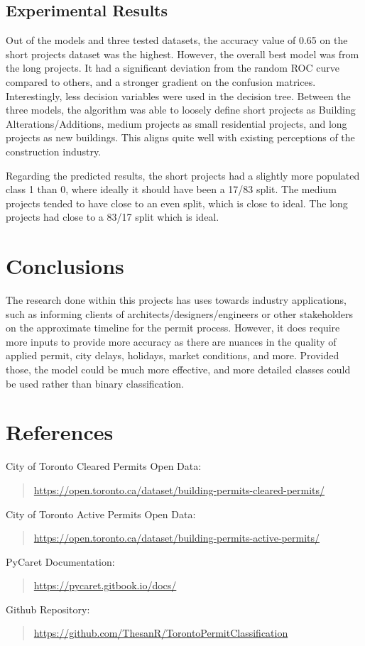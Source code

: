 \documentclass{article}
\begin{document}
\subsection{Experimental Results}
Out of the models and three tested datasets, the accuracy value of 0.65 on the short projects dataset was the highest. However, the overall best model was from the long projects. It had a significant deviation from the random ROC curve compared to others, and a stronger gradient on the confusion matrices. Interestingly, less decision variables were used in the decision tree. Between the three models, the algorithm was able to loosely define short projects as Building Alterations/Additions, medium projects as small residential projects, and long projects as new buildings. This aligns quite well with existing perceptions of the construction industry. 

Regarding the predicted results, the short projects had a slightly more populated class 1 than 0, where ideally it should have been a 17/83 split. The medium projects tended to have close to an even split, which is close to ideal. The long projects had close to a 83/17 split which is ideal. 

\section{Conclusions}
The research done within this projects has uses towards industry applications, such as informing clients of architects/designers/engineers or other stakeholders on the approximate timeline for the permit process. However, it does require more inputs to provide more accuracy as there are nuances in the quality of applied permit, city delays, holidays, market conditions, and more. Provided those, the model could be much more effective, and more detailed classes could be used rather than binary classification.

\section{References}
City of Toronto Cleared Permits Open Data:
\begin{quote}
    \url{https://open.toronto.ca/dataset/building-permits-cleared-permits/}
\end{quote}


City of Toronto Active Permits Open Data:
\begin{quote}
    \url{https://open.toronto.ca/dataset/building-permits-active-permits/}
\end{quote}

PyCaret Documentation:
\begin{quote}
    \url{https://pycaret.gitbook.io/docs/}
\end{quote}

Github Repository:
\begin{quote}
    \url{https://github.com/ThesanR/TorontoPermitClassification}
\end{quote}
\end{document}
